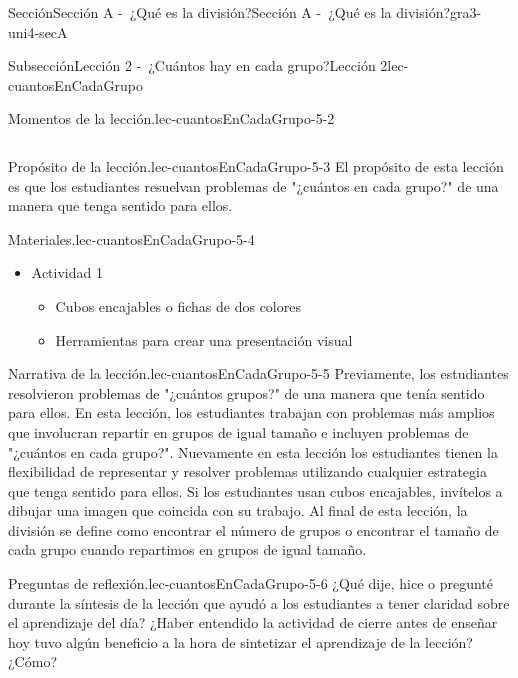 \documentclass[oneside,10pt,]{article}
\begin{document}
\begin{sectionptx}{Sección}{Sección A -~¿Qué es la división?}{}{Sección A -~¿Qué es la división?}{}{}{gra3-uni4-secA}
\begin{subsectionptx}{Subsección}{Lección 2 -~¿Cuántos hay en cada grupo?}{}{Lección 2}{}{}{lec-cuantosEnCadaGrupo}
\begin{introduction}{}
\begin{paragraphs}{Momentos de la lección.}{lec-cuantosEnCadaGrupo-5-2}
\begin{longtable}[l]{ll}
\end{longtable}
\end{paragraphs}%
\begin{paragraphs}{Propósito de la lección.}{lec-cuantosEnCadaGrupo-5-3}%
El propósito de esta lección es que los estudiantes resuelvan problemas de "¿cuántos en cada grupo?" de una manera que tenga sentido para ellos.%
\end{paragraphs}%
\begin{paragraphs}{Materiales.}{lec-cuantosEnCadaGrupo-5-4}%
%
\begin{itemize}[label=\textbullet]
\item{}Actividad 1%
%
\begin{itemize}[label=$\circ$]
\item{}Cubos encajables o fichas de dos colores%
\item{}Herramientas para crear una presentación visual%
\end{itemize}
\end{itemize}
\end{paragraphs}%
\begin{paragraphs}{Narrativa de la lección.}{lec-cuantosEnCadaGrupo-5-5}%
Previamente, los estudiantes resolvieron problemas de "¿cuántos grupos?" de una manera que tenía sentido para ellos. En esta lección, los estudiantes trabajan con problemas más amplios que involucran repartir en grupos de igual tamaño e incluyen problemas de "¿cuántos en cada grupo?". Nuevamente en esta lección los estudiantes tienen la flexibilidad de representar y resolver problemas utilizando cualquier estrategia que tenga sentido para ellos. Si los estudiantes usan cubos encajables, invítelos a dibujar una imagen que coincida con su trabajo. Al final de esta lección, la división se define como encontrar el número de grupos o encontrar el tamaño de cada grupo cuando repartimos en grupos de igual tamaño.%
\end{paragraphs}%
\begin{paragraphs}{Preguntas de reflexión.}{lec-cuantosEnCadaGrupo-5-6}%
¿Qué dije, hice o pregunté durante la síntesis de la lección que ayudó a los estudiantes a tener claridad sobre el aprendizaje del día? ¿Haber entendido la actividad de cierre antes de enseñar hoy tuvo algún beneficio a la hora de sintetizar el aprendizaje de la lección? ¿Cómo?%
\end{paragraphs}%
\end{introduction}%
%
%
\typeout{************************************************}

\end{subsectionptx}
\end{sectionptx}
\end{document}
